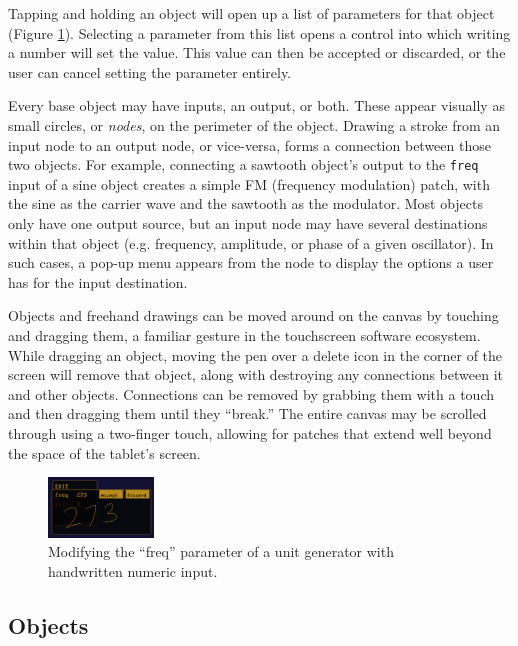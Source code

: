 \documentclass{nime-alternate}
\begin{document}
Tapping and holding an object will open up a list of parameters for that object (Figure \ref{fig:editor}). 
Selecting a parameter from this list opens a control into which writing a number will set the value. 
This value can then be accepted or discarded, or the user can cancel setting the parameter entirely. 

Every base object may have inputs, an output, or both. These appear visually as small circles, or \emph{nodes}, on the perimeter of the object. 
Drawing a stroke from an input node to an output node, or vice-versa, forms a connection between those two objects. 
For example, connecting a sawtooth object's output to the \texttt{freq} input of a sine object creates a simple FM (frequency modulation) patch, with the sine as the carrier wave and the sawtooth as the modulator. 
Most objects only have one output source, but an input node may have several destinations within that object (e.g. frequency, amplitude, or phase of a given oscillator). 
In such cases, a pop-up menu appears from the node to display the options a user has for the input destination. 

Objects and freehand drawings can be moved around on the canvas by touching and dragging them, a familiar gesture in the touchscreen software ecosystem. 
While dragging an object, moving the pen over a delete icon in the corner of the screen will remove that object, along with destroying any connections between it and other objects. 
Connections can be removed by grabbing them with a touch and then dragging them until they ``break.''
The entire canvas may be scrolled through using a two-finger touch, allowing for patches that extend well beyond the space of the tablet's screen. 

\begin{figure}[h]
	\centering
		\includegraphics[width=0.25\textwidth]{figures/editor.png}
	\caption{Modifying the ``freq'' parameter of a unit generator with handwritten numeric input.}
	\label{fig:editor}
\end{figure}

\subsection{Objects}
\label{sec:BaseGlyphs}
\end{document}

